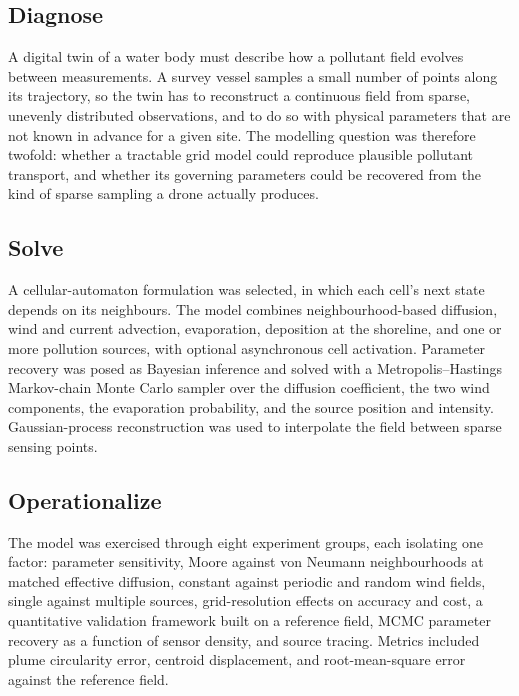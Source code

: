 \documentclass[a4paper,12pt,oneside,openany]{report}
\begin{document}
\subsection{Diagnose}

A digital twin of a water body must describe how a pollutant field evolves between measurements. A
survey vessel samples a small number of points along its trajectory, so the twin has to reconstruct
a continuous field from sparse, unevenly distributed observations, and to do so with physical
parameters that are not known in advance for a given site. The modelling question was therefore
twofold: whether a tractable grid model could reproduce plausible pollutant transport, and whether
its governing parameters could be recovered from the kind of sparse sampling a drone actually
produces.

\subsection{Solve}

A cellular-automaton formulation was selected, in which each cell's next state depends on its
neighbours. The model combines neighbourhood-based diffusion, wind and current advection,
evaporation, deposition at the shoreline, and one or more pollution sources, with optional
asynchronous cell activation. Parameter recovery was posed as Bayesian inference and solved with a
Metropolis--Hastings Markov-chain Monte Carlo sampler over the diffusion coefficient, the two wind
components, the evaporation probability, and the source position and intensity. Gaussian-process
reconstruction was used to interpolate the field between sparse sensing points.

\subsection{Operationalize}

The model was exercised through eight experiment groups, each isolating one factor: parameter
sensitivity, Moore against von Neumann neighbourhoods at matched effective diffusion,
constant against periodic and random wind fields, single against multiple sources, grid-resolution
effects on accuracy and cost, a quantitative validation framework built on a reference field,
MCMC parameter recovery as a function of sensor density, and source tracing. Metrics included plume
circularity error, centroid displacement, and root-mean-square error against the reference field.
\end{document}
